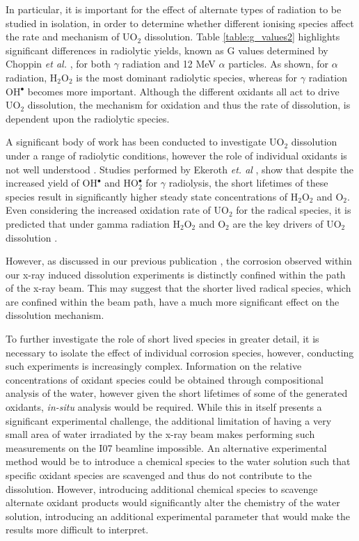 \documentclass[twocolumn,prl,nobalancelastpage,aps,10pt]{revtex4-1}
\begin{document}
In particular, it is important for the effect of alternate types of radiation to be studied in isolation, in order to determine whether different ionising species affect the rate and mechanism of UO$_2$ dissolution. Table \ref{table:g_values2} highlights significant differences in radiolytic yields, known as G values determined by Choppin \textit{et al.} \cite{Choppin1995}, for both $\gamma$ radiation and 12 MeV $\alpha$ particles. As shown, for $\alpha$ radiation, H$_2$O$_2$ is the most dominant radiolytic species, whereas for $\gamma$ radiation OH$^{\bullet}$ becomes more important. Although the different oxidants all act to drive UO$_2$ dissolution, the mechanism for oxidation and thus the rate of dissolution, is dependent upon the radiolytic species.

A significant body of work has been conducted to investigate UO$_2$ dissolution under a range of radiolytic conditions, however the role of individual oxidants is not well understood \cite{Ekeroth2006}. Studies performed by Ekeroth \textit{et. al} \cite{Ekeroth2006}, show that despite the increased yield of OH$^{\bullet}$ and HO$^{\bullet}_2$ for $\gamma$ radiolysis, the short lifetimes of these species result in significantly higher steady state concentrations of H$_2$O$_2$ and O$_2$. Even considering the increased oxidation rate of UO$_2$ for the radical species, it is predicted that under gamma radiation H$_2$O$_2$ and O$_2$ are the key drivers of UO$_2$ dissolution \cite{Ekeroth2006}.

However, as discussed in our previous publication \cite{Springell2015}, the corrosion observed within our x-ray induced dissolution experiments is distinctly confined within the path of the x-ray beam. This may suggest that the shorter lived radical species, which are confined within the beam path, have a much more significant effect on the dissolution mechanism.

To further investigate the role of short lived species in greater detail, it is necessary to isolate the effect of individual corrosion species, however, conducting such experiments is increasingly complex. Information on the relative concentrations of oxidant species could be obtained through compositional analysis of the water, however given the short lifetimes of some of the generated oxidants, \textit{in-situ} analysis would be required. While this in itself presents a significant experimental challenge, the additional limitation of having a very small area of water irradiated by the x-ray beam makes performing such measurements on the I07 beamline impossible. An alternative experimental method would be to introduce a chemical species to the water solution such that specific oxidant species are scavenged and thus do not contribute to the dissolution. However, introducing additional chemical species to scavenge alternate oxidant products would significantly alter the chemistry of the water solution, introducing an additional experimental parameter that would make the results more difficult to interpret.
\end{document}

